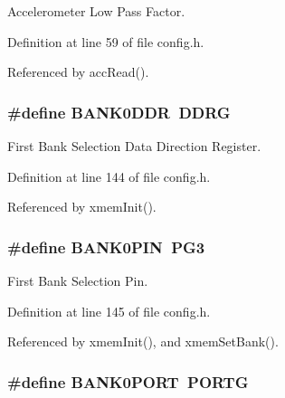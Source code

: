Accelerometer Low Pass Factor. 



Definition at line 59 of file config.\-h.



Referenced by acc\-Read().

\hypertarget{group__config_gafba0bbf9336cfc754622a5e9b3d12d80}{
\subsubsection[{B\-A\-N\-K0\-D\-D\-R}]{\setlength{\rightskip}{0pt plus 5cm}\#define B\-A\-N\-K0\-D\-D\-R~D\-D\-R\-G}}\label{group__config_gafba0bbf9336cfc754622a5e9b3d12d80}


First Bank Selection Data Direction Register. 



Definition at line 144 of file config.\-h.



Referenced by xmem\-Init().

\hypertarget{group__config_gaa176e9b2752f764cd7e7d9fd49d46af8}{
\subsubsection[{B\-A\-N\-K0\-P\-I\-N}]{\setlength{\rightskip}{0pt plus 5cm}\#define B\-A\-N\-K0\-P\-I\-N~P\-G3}}\label{group__config_gaa176e9b2752f764cd7e7d9fd49d46af8}


First Bank Selection Pin. 



Definition at line 145 of file config.\-h.



Referenced by xmem\-Init(), and xmem\-Set\-Bank().

\hypertarget{group__config_gabeec1986c81588dde8863b7936028fc9}{
\subsubsection[{B\-A\-N\-K0\-P\-O\-R\-T}]{\setlength{\rightskip}{0pt plus 5cm}\#define B\-A\-N\-K0\-P\-O\-R\-T~P\-O\-R\-T\-G}}\label{group__config_gabeec1986c81588dde8863b7936028fc9}


